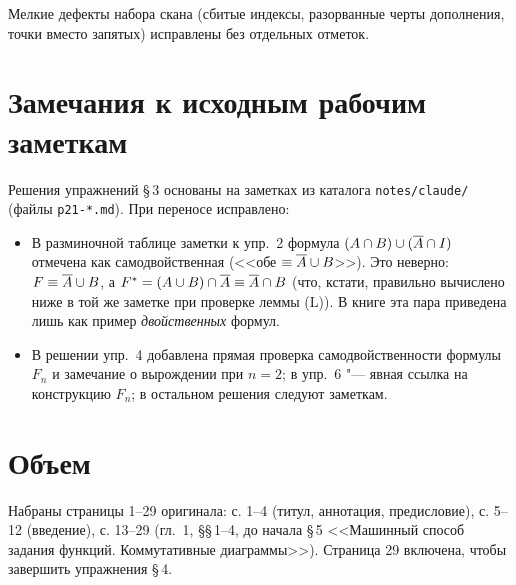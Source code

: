 Мелкие дефекты набора скана (сбитые индексы, разорванные черты
дополнения, точки вместо запятых) исправлены без отдельных отметок.

\section*{Замечания к исходным рабочим заметкам}
Решения упражнений \S\,3 основаны на заметках из каталога
\texttt{notes/claude/} (файлы \texttt{p21-*.md}). При переносе исправлено:
\begin{itemize}
\item В разминочной таблице заметки к упр.~2 формула
  $(A\cap B)\cup(\overline{A}\cap I)$ отмечена как самодвойственная (<<обе
  $\equiv\overline{A}\cup B$>>). Это неверно: $F\equiv\overline{A}\cup B$, а
  $F^*=(A\cup B)\cap\overline{A}\equiv\overline{A}\cap B$ (что, кстати, правильно
  вычислено ниже в той же заметке при проверке леммы (L)). В книге эта пара
  приведена лишь как пример \emph{двойственных} формул.
\item В решении упр.~4 добавлена прямая проверка самодвойственности
  формулы $F_n$ и замечание о вырождении при $n=2$; в упр.~6 "--- явная
  ссылка на конструкцию $F_n$; в остальном решения следуют заметкам.
\end{itemize}

\section*{Объем}
Набраны страницы 1--29 оригинала: с. 1--4 (титул, аннотация,
предисловие), с. 5--12 (введение), с. 13--29 (гл.~1, \S\S\,1--4, до
начала \S\,5 <<Машинный способ задания функций. Коммутативные диаграммы>>).
Страница 29 включена, чтобы завершить упражнения \S\,4.
